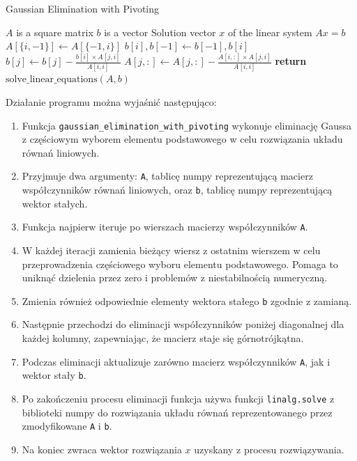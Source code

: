 \documentclass[9pt]{article}
\begin{document}
\begin{algorithm}
\caption{Gaussian Elimination with Pivoting}
\begin{algorithmic}[1]
\Require $A$ is a square matrix
\Require $b$ is a vector
\Ensure Solution vector $x$ of the linear system $Ax = b$
        \State $A[\{i, -1\}] \gets A[\{-1, i\}]$
        \State $b[i], b[-1] \gets b[-1], b[i]$
                \State $b[j] \gets b[j] - \frac{b[i] \times A[j, i]}{A[i, i]}$
                \State $A[j, :] \gets A[j, :] - \frac{A[i, :] \times A[j, i]}{A[i, i]}$
            \EndIf
        \EndFor
    \EndFor
    \State \textbf{return} $\text{solve\_linear\_equations}(A, b)$
\end{algorithmic}
\end{algorithm}
\newpage

Działanie programu można wyjaśnić następująco:

\begin{enumerate}
    \item Funkcja \texttt{gaussian\_elimination\_with\_pivoting} wykonuje eliminację Gaussa z częściowym wyborem elementu podstawowego w celu rozwiązania układu równań liniowych.
    \item Przyjmuje dwa argumenty: \texttt{A}, tablicę numpy reprezentującą macierz współczynników równań liniowych, oraz \texttt{b}, tablicę numpy reprezentującą wektor stałych.
    \item Funkcja najpierw iteruje po wierszach macierzy współczynników \texttt{A}.
    \item W każdej iteracji zamienia bieżący wiersz z ostatnim wierszem w celu przeprowadzenia częściowego wyboru elementu podstawowego. Pomaga to uniknąć dzielenia przez zero i problemów z niestabilnością numeryczną.
    \item Zmienia również odpowiednie elementy wektora stałego \texttt{b} zgodnie z zamianą.
    \item Następnie przechodzi do eliminacji współczynników poniżej diagonalnej dla każdej kolumny, zapewniając, że macierz staje się górnotrójkątna.
    \item Podczas eliminacji aktualizuje zarówno macierz współczynników \texttt{A}, jak i wektor stały \texttt{b}.
    \item Po zakończeniu procesu eliminacji funkcja używa funkcji \texttt{linalg.solve} z biblioteki numpy do rozwiązania układu równań reprezentowanego przez zmodyfikowane \texttt{A} i \texttt{b}.
    \item Na koniec zwraca wektor rozwiązania \(x\) uzyskany z procesu rozwiązywania.
\end{enumerate}
\end{document}
